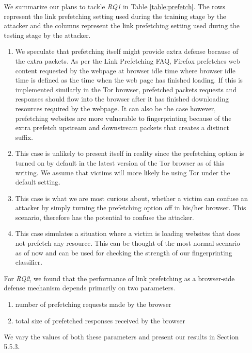 We summarize our plans to tackle \emph{RQ1} in Table \ref{table:prefetch}.
The rows represent the link prefetching setting used during the training stage by the
attacker and the columns represent the link prefetching setting used
during the testing stage by the attacker. 
\begin{enumerate}
\item
We speculate that prefetching itself might provide extra defense because
of the extra packets. As per the Link Prefetching FAQ\cite{fisher2003},
Firefox prefetches web content requested by the webpage at browser idle
time where browser idle time is defined as the time when the web page
has finished loading. If this is implemented similarly in the Tor
browser, prefetched packets requests and responses should flow into the
browser after it has finished downloading resources required by the
webpage.
It can also be the case however, prefetching websites are more
vulnerable to fingerprinting because of the extra prefetch upstream and
downstream packets that
creates a distinct suffix.
\item
This case is unlikely to present itself in reality since the prefetching option is turned on by
default in the latest version of the Tor browser as of this writing. We assume that victims will more likely be using Tor under the default setting.
\item
This case is what we are most curious about, whether a victim can
confuse an attacker by simply turning the prefetching option off in
his/her browser. This scenario, therefore has the potential to confuse the
attacker.
\item
This case simulates a situation where a victim is loading websites that does not prefetch any resource.
This can be thought of the most normal scenario as of now and can be used for checking the strength of our fingerprinting classifier.
\end{enumerate}

For \emph{RQ2}, we found that the performance of link prefetching as a
browser-side defense mechanism depends primarily on two parameters.
\begin{enumerate}
\item 
number of prefetching requests made by the browser 
\item 
total size of prefetched responses received by the browser
\end{enumerate}
We vary the values of both these parameters and present our results in
Section 5.5.3.
 
